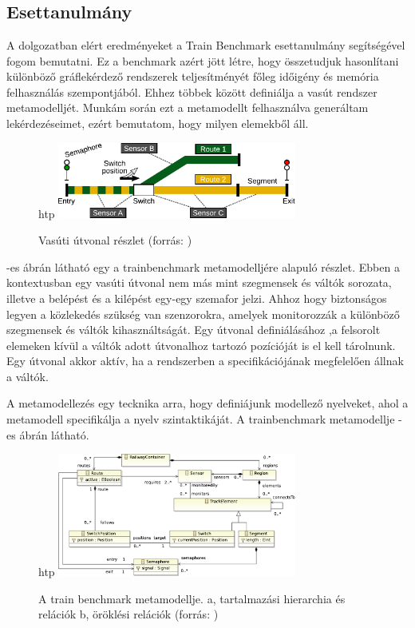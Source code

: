 \chapter{\eloismeretek}

\section{Esettanulmány}
A dolgozatban elért eredményeket a Train Benchmark \cite{szarnyas2018train} esettanulmány segítségével fogom bemutatni. Ez a benchmark azért jött létre, hogy összetudjuk hasonlítani különböző gráflekérdező rendszerek teljesítményét főleg időigény és memória felhasználás szempontjából. Ehhez többek között definiálja a vasút rendszer metamodelljét. Munkám során ezt a metamodellt felhasználva generáltam lekérdezéseimet, ezért bemutatom, hogy milyen elemekből áll. 

\begin{figure}{htp}
	\centering
	\includegraphics[width=0.7\textwidth]{figures/trainbenchmarkfig1}
	\caption{Vasúti útvonal részlet (forrás: \cite{szarnyas2018train})}
	\label{fig:trainbenchmark}
\end{figure}

 -es ábrán látható egy a trainbenchmark metamodelljére alapuló részlet. Ebben a kontextusban egy vasúti útvonal nem más mint szegmensek és váltók sorozata, illetve a belépést és a kilépést egy-egy szemafor jelzi. Ahhoz hogy biztonságos legyen a közlekedés szükség van szenzorokra, amelyek monitorozzák a különböző szegmensek és váltók kihasználtságát. Egy útvonal definiálásához ,a felsorolt elemeken kívül a váltók adott útvonalhoz tartozó pozícióját is el kell tárolnunk. Egy útvonal akkor aktív, ha a rendszerben a specifikációjának megfelelően állnak a váltók.

A metamodellezés egy tecknika arra, hogy definiájunk modellező nyelveket, ahol a metamodell specifikálja a nyelv szintaktikáját. A trainbenchmark metamodellje  -es ábrán látható.

\begin{figure}{htp}
	\centering
	\includegraphics[width=0.7\textwidth]{figures/trainbenchmarkfig2}
	\caption{A train benchmark metamodellje. a, tartalmazási hierarchia és relációk b, öröklési relációk (forrás: \cite{szarnyas2018train})}
	\label{fig:trainbenchmarkmetamodell}
\end{figure}


